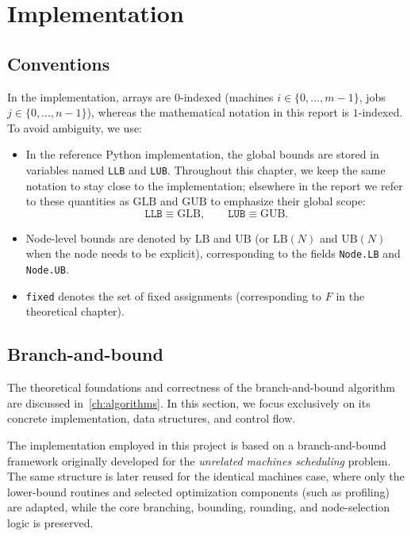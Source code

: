 \chapter{Implementation}
\label{ch:implementation}

\section*{Conventions}
In the implementation, arrays are $0$-indexed (machines $i\in\{0,\dots,m-1\}$, jobs $j\in\{0,\dots,n-1\}$), whereas the mathematical notation in this report is $1$-indexed.
To avoid ambiguity, we use:
\begin{itemize}
  \item In the reference Python implementation, the global bounds are stored in variables named \texttt{LLB} and \texttt{LUB}.
  Throughout this chapter, we keep the same notation to stay close to the implementation; elsewhere in the report we refer to these quantities as $\mathrm{GLB}$ and $\mathrm{GUB}$ to emphasize their global scope:
  \[
    \texttt{LLB} \equiv \mathrm{GLB}, \qquad \texttt{LUB} \equiv \mathrm{GUB}.
  \]
  \item Node-level bounds are denoted by $\mathrm{LB}$ and $\mathrm{UB}$ (or $\mathrm{LB}(N)$ and $\mathrm{UB}(N)$ when the node needs to be explicit), corresponding to the fields \texttt{Node.LB} and \texttt{Node.UB}.
  \item \texttt{fixed} denotes the set of fixed assignments (corresponding to $F$ in the theoretical chapter).
\end{itemize}

\section{Branch-and-bound}
\label{sec:bb-framework}

The theoretical foundations and correctness of the branch-and-bound algorithm are discussed in~\ref{ch:algorithms}.
In this section, we focus exclusively on its concrete implementation, data structures, and control flow.

The implementation employed in this project is based on a branch-and-bound framework originally developed for the \emph{unrelated machines scheduling} problem.
The same structure is later reused for the identical machines case, where only the lower-bound routines and selected optimization components (such as profiling) are adapted, while the core branching, bounding, rounding, and node-selection logic is preserved.

